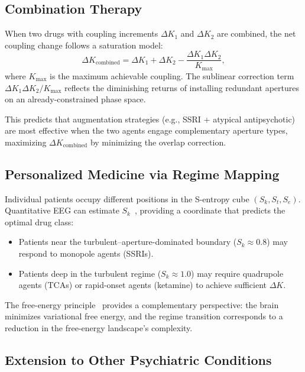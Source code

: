 \documentclass[10pt,twocolumn]{article}
\theoremstyle{definition}
\theoremstyle{remark}
\begin{document}
\subsection{Combination Therapy}

When two drugs with coupling increments $\Delta K_1$ and
$\Delta K_2$ are combined, the net coupling change follows
a saturation model:
\begin{equation}\label{eq:combination}
  \Delta K_{\text{combined}} = \Delta K_1 + \Delta K_2
  - \frac{\Delta K_1 \Delta K_2}{K_{\max}},
\end{equation}
where $K_{\max}$ is the maximum achievable coupling.
The sublinear correction term $\Delta K_1 \Delta K_2 / K_{\max}$
reflects the diminishing returns of installing redundant
apertures on an already-constrained phase space.

This predicts that augmentation strategies (e.g., SSRI + atypical
antipsychotic) are most effective when the two agents engage
complementary aperture types, maximizing $\Delta K_{\text{combined}}$
by minimizing the overlap correction.

\subsection{Personalized Medicine via Regime Mapping}

Individual patients occupy different positions in the S-entropy
cube $(S_k, S_t, S_e)$.  Quantitative EEG can estimate
$S_k$~\cite{Leuchter2012,Fingelkurts2005}, providing a
coordinate that predicts the optimal drug class:
\begin{itemize}[leftmargin=*]
  \item Patients near the turbulent--aperture-dominated boundary
        ($S_k \approx 0.8$) may respond to monopole agents (SSRIs).
  \item Patients deep in the turbulent regime ($S_k \approx 1.0$)
        may require quadrupole agents (TCAs) or rapid-onset agents
        (ketamine) to achieve sufficient $\Delta K$.
\end{itemize}

The free-energy principle~\cite{Friston2010} provides a complementary
perspective: the brain minimizes variational free energy, and
the regime transition corresponds to a reduction in the
free-energy landscape's complexity.

\subsection{Extension to Other Psychiatric Conditions}
\end{document}

